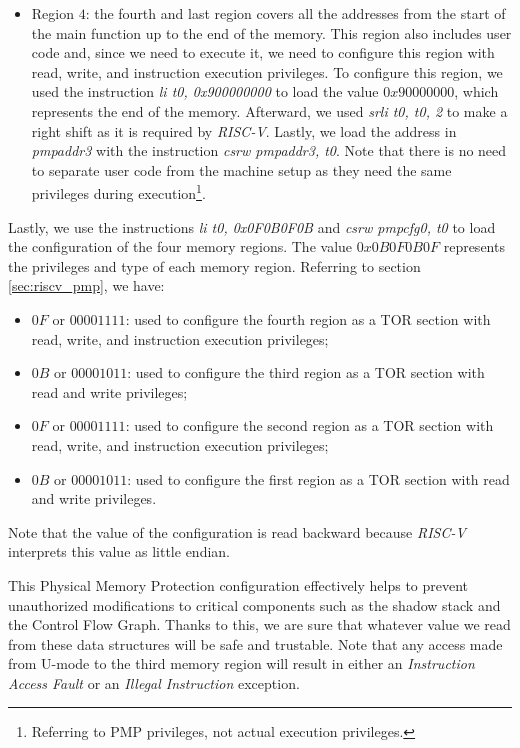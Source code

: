 \begin{itemize}
  \item Region $4$: the fourth and last region covers all the addresses from the
    start of the main function up to the end of the memory. This region also includes
    user code and, since we need to execute it, we need to configure this region
    with read, write, and instruction execution privileges. To configure this
    region, we used the instruction \textit{li t0, 0x900000000} to load the
    value $0x90000000$, which represents the end of the memory. Afterward, we used
    \textit{srli t0, t0, 2} to make a right shift as it is required by \textit{RISC-V}.
    Lastly, we load the address in \textit{pmpaddr3} with the instruction
    \textit{csrw pmpaddr3, t0}. Note that there is no need to separate user code
    from the machine setup as they need the same privileges during execution\footnote{Referring
    to PMP privileges, not actual execution privileges.}.
\end{itemize}

Lastly, we use the instructions \textit{li t0, 0x0F0B0F0B} and \textit{csrw
pmpcfg0, t0} to load the configuration of the four memory regions. The value $0x0
B0F0B0F$ represents the privileges and type of each memory region. Referring to
section \ref{sec:riscv_pmp}, we have:
\begin{itemize}
  \item $0F$ or $00001111$: used to configure the fourth region as a TOR section
    with read, write, and instruction execution privileges;

  \item $0B$ or $00001011$: used to configure the third region as a TOR section
    with read and write privileges;

  \item $0F$ or $00001111$: used to configure the second region as a TOR section
    with read, write, and instruction execution privileges;

  \item $0B$ or $00001011$: used to configure the first region as a TOR section
    with read and write privileges.
\end{itemize}

Note that the value of the configuration is read backward because \textit{RISC-V}
interprets this value as little endian.

This Physical Memory Protection configuration effectively helps to prevent
unauthorized modifications to critical components such as the shadow stack and
the Control Flow Graph. Thanks to this, we are sure that whatever value we read
from these data structures will be safe and trustable. Note that any access made
from U-mode to the third memory region will result in either an \textit{Instruction
Access Fault} or an \textit{Illegal Instruction} exception.

